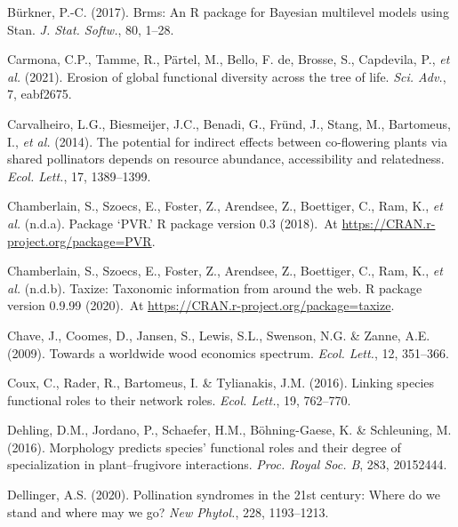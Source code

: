 \documentclass[
  12pt,
  a4paper,
]{article}
\newlength{\cslhangindent}
\newlength{\cslentryspacingunit} %
\newenvironment{CSLReferences}[2] %
 {%
  \setlength{\parindent}{0pt}
  \ifodd #1
  \let\oldpar\par
  \def\par{\hangindent=\cslhangindent\oldpar}
  \fi
  \setlength{\parskip}{#2\cslentryspacingunit}
 }%
 {}
\begin{document}
\begin{CSLReferences}{1}{0}
\leavevmode{}%
Bürkner, P.-C. (2017). Brms: {An R} package for {Bayesian} multilevel models using {Stan}. \emph{J. Stat. Softw.}, 80, 1--28.

\leavevmode{}%
Carmona, C.P., Tamme, R., Pärtel, M., Bello, F. de, Brosse, S., Capdevila, P., \emph{et al.} (2021). Erosion of global functional diversity across the tree of life. \emph{Sci. Adv.}, 7, eabf2675.

\leavevmode{}%
Carvalheiro, L.G., Biesmeijer, J.C., Benadi, G., Fründ, J., Stang, M., Bartomeus, I., \emph{et al.} (2014). The potential for indirect effects between co-flowering plants via shared pollinators depends on resource abundance, accessibility and relatedness. \emph{Ecol. Lett.}, 17, 1389--1399.

\leavevmode{}%
Chamberlain, S., Szoecs, E., Foster, Z., Arendsee, Z., Boettiger, C., Ram, K., \emph{et al.} (n.d.a). Package {`{PVR}.'} R package version 0.3 (2018).~At \href{https://CRAN.R-project.org/package=PVR}{https://CRAN.r-project.org/package=PVR}.

\leavevmode{}%
Chamberlain, S., Szoecs, E., Foster, Z., Arendsee, Z., Boettiger, C., Ram, K., \emph{et al.} (n.d.b). Taxize: {Taxonomic} information from around the web. R package version 0.9.99 (2020).~At \href{https://CRAN.R-project.org/package=taxize}{https://CRAN.r-project.org/package=taxize}.

\leavevmode{}%
Chave, J., Coomes, D., Jansen, S., Lewis, S.L., Swenson, N.G. \& Zanne, A.E. (2009). Towards a worldwide wood economics spectrum. \emph{Ecol. Lett.}, 12, 351--366.

\leavevmode{}%
Coux, C., Rader, R., Bartomeus, I. \& Tylianakis, J.M. (2016). Linking species functional roles to their network roles. \emph{Ecol. Lett.}, 19, 762--770.

\leavevmode{}%
Dehling, D.M., Jordano, P., Schaefer, H.M., Böhning-Gaese, K. \& Schleuning, M. (2016). Morphology predicts species' functional roles and their degree of specialization in plant--frugivore interactions. \emph{Proc. Royal Soc. B}, 283, 20152444.

\leavevmode{}%
Dellinger, A.S. (2020). Pollination syndromes in the 21st century: Where do we stand and where may we go? \emph{New Phytol.}, 228, 1193--1213.


\end{CSLReferences}
\end{document}

